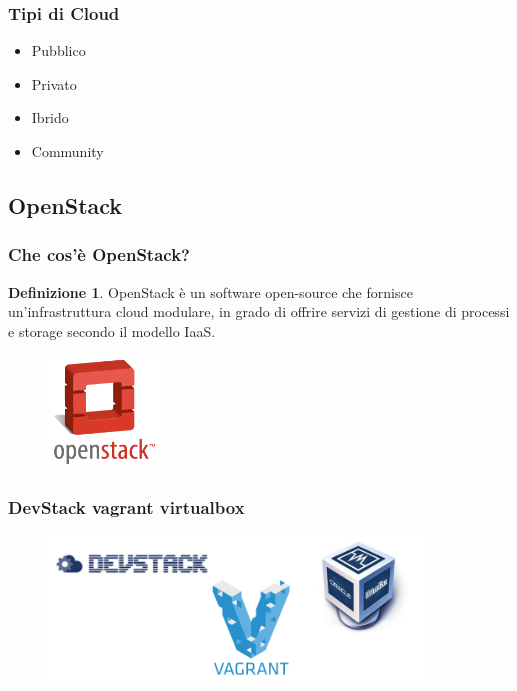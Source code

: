 \documentclass{beamer}
\theoremstyle{definition}
\newtheorem{definizione}{Definizione}
\theoremstyle{plain}
\begin{document}
\begin{frame}
\frametitle{Tipi di Cloud}
\begin{itemize}
\item
Pubblico
\item
Privato
\item
Ibrido
\item
Community
\end{itemize}
\end{frame}
\subsection{OpenStack}
\begin{frame}
\frametitle{Che cos'è OpenStack?}
\begin{definizione}
\alert{OpenStack} è un software open-source che fornisce un'infrastruttura cloud modulare, in grado di offrire servizi di gestione di processi e storage secondo il modello IaaS.

\begin{figure}[!h]
	\begin{center}
\includegraphics[width=3cm]{openstack.png}
\end{center}
\end{figure}

\end{definizione}
\end{frame}

\begin{frame}
\frametitle{DevStack vagrant virtualbox}
\begin{figure}[!h]
	\begin{center}
\includegraphics[width=10cm]{Vagrant.png}
\end{center}
\end{figure}
\end{frame}
\end{document}
